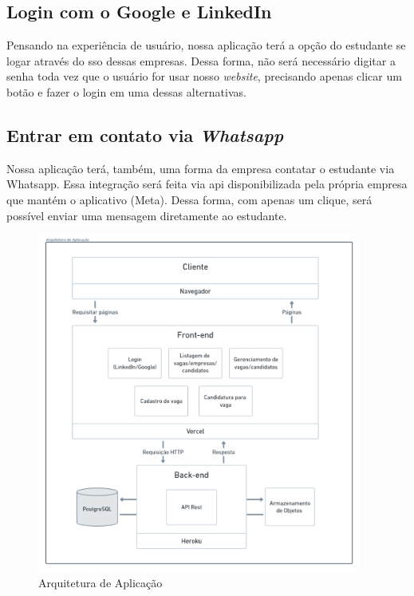 \subsection{Login com o Google e LinkedIn}
Pensando na experiência de usuário, nossa aplicação terá a opção do estudante se logar através do \ac{sso} dessas empresas. Dessa forma, não será necessário digitar a senha toda vez que o usuário for usar nosso \emph{website}, precisando apenas clicar um botão e fazer o login em uma dessas alternativas.

\subsection{Entrar em contato via \emph{Whatsapp}}
Nossa aplicação terá, também, uma forma da empresa contatar o estudante via Whatsapp. Essa integração será feita via \ac{api} disponibilizada pela própria empresa que mantém o aplicativo (Meta). Dessa forma, com apenas um clique, será possível enviar uma mensagem diretamente ao estudante.

\begin{figure}[htb]
	\centering
	\caption{\label{fig_arq_app}Arquitetura de Aplicação}
	\includegraphics[width=0.95\textwidth]{imagens/arq-proj-arq-app.png}
\end{figure}

